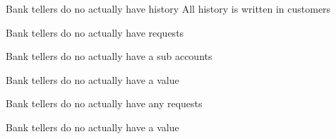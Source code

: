 \documentclass[letterpaper,10pt,english]{sphinxmanual}
\begin{document}
\begin{fulllineitems}
\begin{fulllineitems}
\label{\detokenize{bank:bank.bankTeller.BankTeller.getHistory}}
Bank tellers do no actually have history
All history is written in customers

\end{fulllineitems}


\begin{fulllineitems}
\label{\detokenize{bank:bank.bankTeller.BankTeller.getRequests}}
Bank tellers do no actually have requests

\end{fulllineitems}


\begin{fulllineitems}
\label{\detokenize{bank:bank.bankTeller.BankTeller.getSubaccounts}}
Bank tellers do no actually have a sub accounts

\end{fulllineitems}


\begin{fulllineitems}
\label{\detokenize{bank:bank.bankTeller.BankTeller.getValue}}
Bank tellers do no actually have a value

\end{fulllineitems}


\begin{fulllineitems}
\label{\detokenize{bank:bank.bankTeller.BankTeller.removeRequest}}
Bank tellers do no actually have any requests

\end{fulllineitems}


\begin{fulllineitems}
\label{\detokenize{bank:bank.bankTeller.BankTeller.requestDelta}}
Bank tellers do no actually have a value


\end{fulllineitems}
\end{fulllineitems}
\end{document}
